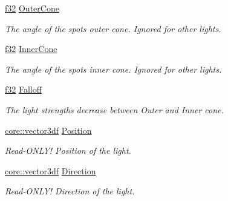 \begin{DoxyCompactItemize}
\mbox{\label{structirr_1_1video_1_1SLight_a38ee805b9145d4ab1b1a889bbded9adc}} 
\hyperlink{namespaceirr_a0277be98d67dc26ff93b1a6a1d086b07}{f32} \hyperlink{structirr_1_1video_1_1SLight_a38ee805b9145d4ab1b1a889bbded9adc}{Outer\+Cone}
\begin{DoxyCompactList}\small\item\em The angle of the spot\textquotesingle{}s outer cone. Ignored for other lights. \end{DoxyCompactList}\item 
\mbox{\label{structirr_1_1video_1_1SLight_ab079c170fbab1e0a191e8801839d6c83}} 
\hyperlink{namespaceirr_a0277be98d67dc26ff93b1a6a1d086b07}{f32} \hyperlink{structirr_1_1video_1_1SLight_ab079c170fbab1e0a191e8801839d6c83}{Inner\+Cone}
\begin{DoxyCompactList}\small\item\em The angle of the spot\textquotesingle{}s inner cone. Ignored for other lights. \end{DoxyCompactList}\item 
\mbox{\label{structirr_1_1video_1_1SLight_a38cea8db5e6951a9d98802f2f249129d}} 
\hyperlink{namespaceirr_a0277be98d67dc26ff93b1a6a1d086b07}{f32} \hyperlink{structirr_1_1video_1_1SLight_a38cea8db5e6951a9d98802f2f249129d}{Falloff}
\begin{DoxyCompactList}\small\item\em The light strength\textquotesingle{}s decrease between Outer and Inner cone. \end{DoxyCompactList}\item 
\hyperlink{namespaceirr_1_1core_a06f169d08b5c429f5575acb7edbad811}{core\+::vector3df} \hyperlink{structirr_1_1video_1_1SLight_ac1f0fda0cc1780b09a2597adcfc9c946}{Position}
\begin{DoxyCompactList}\small\item\em Read-\/\+O\+N\+L\+Y! Position of the light. \end{DoxyCompactList}\item 
\hyperlink{namespaceirr_1_1core_a06f169d08b5c429f5575acb7edbad811}{core\+::vector3df} \hyperlink{structirr_1_1video_1_1SLight_a226c488abec5696b995df6895ab42d41}{Direction}
\begin{DoxyCompactList}\small\item\em Read-\/\+O\+N\+L\+Y! Direction of the light. \end{DoxyCompactList}\item 

\end{DoxyCompactItemize}

